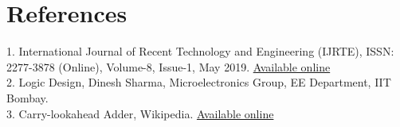 \documentclass[conference]{IEEEtran}
\begin{document}
\section*{References}
1. International Journal of Recent Technology and Engineering (IJRTE),  
   ISSN: 2277-3878 (Online), Volume-8, Issue-1, May 2019.  
   \href{https://www.ijrte.org/wp-content/uploads/papers/v8i1/A1382058119.pdf}{Available online} \\[0.5em]

2. Logic Design, Dinesh Sharma, Microelectronics Group, EE Department, IIT Bombay. \\[0.5em]

3. Carry-lookahead Adder, Wikipedia.  
\href{https://en.wikipedia.org/wiki/Carry-lookahead_adder}{Available online}
\end{document}
